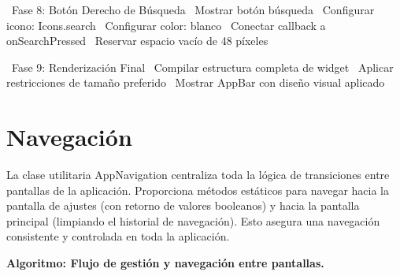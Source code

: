 \begin{algorithmic}[1]
\State~Fase 8: Botón Derecho de Búsqueda
%
    \State~Mostrar botón búsqueda
    \State~Configurar icono: Icons.search
    \State~Configurar color: blanco
    \State~Conectar callback a onSearchPressed
\Else%
    \State~Reservar espacio vacío de 48 píxeles
\EndIf%

\State~Fase 9: Renderización Final
\State~Compilar estructura completa de widget
\State~Aplicar restricciones de tamaño preferido
\State~Mostrar AppBar con diseño visual aplicado

\end{algorithmic}

\section{Navegación}

La clase utilitaria AppNavigation centraliza toda la lógica de transiciones entre pantallas de la aplicación. Proporciona métodos estáticos para navegar hacia la pantalla de ajustes (con retorno de valores booleanos) y hacia la pantalla principal (limpiando el historial de navegación). Esto asegura una navegación consistente y controlada en toda la aplicación.
\par

\noindent\textbf{Algoritmo: Flujo de gestión y navegación entre pantallas.}

